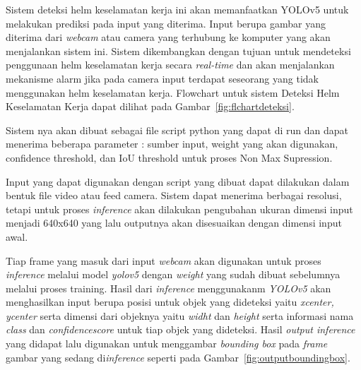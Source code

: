 \par Sistem deteksi helm keselamatan kerja ini akan memanfaatkan YOLOv5 untuk melakukan prediksi pada input yang diterima. Input berupa gambar yang diterima dari \emph{webcam}
atau camera yang terhubung ke komputer yang akan menjalankan sistem ini. Sistem dikembangkan dengan tujuan untuk mendeteksi penggunaan helm keselamatan kerja secara \emph{real-time}
dan akan menjalankan mekanisme alarm jika pada camera input terdapat seseorang yang tidak menggunakan helm keselamatan kerja. 
Flowchart untuk sistem Deteksi Helm Keselamatan Kerja dapat dilihat pada Gambar~\ref{fig:flchartdeteksi}.


\par Sistem nya akan dibuat sebagai file script python yang dapat di run dan dapat menerima beberapa parameter :  sumber input, weight yang akan digunakan, confidence threshold, dan IoU threshold untuk proses Non Max Supression. 
\par Input yang dapat digunakan dengan script yang dibuat dapat dilakukan dalam bentuk file video atau feed camera. 
Sistem dapat menerima berbagai resolusi, tetapi untuk proses \emph{inference} akan dilakukan pengubahan ukuran dimensi input menjadi 640x640 yang lalu outputnya akan
disesuaikan dengan dimensi input awal.


\par Tiap frame yang masuk dari input \emph{webcam} akan digunakan untuk proses \emph{inference} melalui 
model \emph{yolov5} dengan \emph{weight} yang sudah dibuat sebelumnya melalui proses training. 
Hasil dari \emph{inference} menggunakanm \emph{YOLOv5} akan menghasilkan input berupa posisi untuk 
objek yang dideteksi yaitu \emph{xcenter, ycenter} serta dimensi dari objeknya yaitu \emph{widht} 
dan \emph{height} serta informasi nama \emph{class} dan \emph{confidence\textunderscore score} untuk 
tiap objek yang dideteksi. Hasil \emph{output inference} yang didapat lalu digunakan untuk menggambar 
\emph{bounding box} pada \emph{frame} gambar yang sedang di\emph{inference} 
seperti pada Gambar~\ref{fig:outputboundingbox}.

